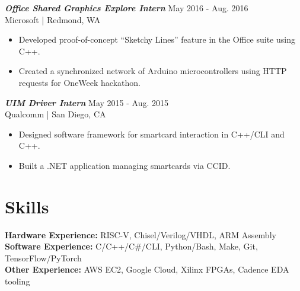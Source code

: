 \documentclass[letter]{res}
\begin{document}
\begin{resume}
%
%
%

{\sl \textbf{Office Shared Graphics Explore Intern}} \hfill May 2016 - Aug. 2016\\
Microsoft | Redmond, WA \newline
 \vspace{-4mm}
  \begin{itemize}
  \item Developed proof-of-concept ``Sketchy Lines'' feature in the Office suite using C++.
  \item Created a synchronized network of Arduino microcontrollers using HTTP requests for OneWeek hackathon.
  \end{itemize}

\vspace{-2.5mm}

{\sl \textbf{UIM Driver Intern}} \hfill May 2015 - Aug. 2015\\
Qualcomm | San Diego, CA \newline

 \vspace{-4mm}

 \begin{itemize}
 \item Designed software framework for smartcard interaction in C++/CLI and C++.
 \item Built a .NET application managing smartcards via CCID.
 \end{itemize}

\vspace{-4.5mm}

\section{Skills}
\textbf{Hardware Experience:} RISC-V, Chisel/Verilog/VHDL, ARM Assembly\\
\textbf{Software Experience:} C/C++/C\#/CLI, Python/Bash, Make, Git, TensorFlow/PyTorch\\
\textbf{Other Experience:} AWS EC2, Google Cloud, Xilinx FPGAs, Cadence EDA tooling\\


\end{resume}
\end{document}
